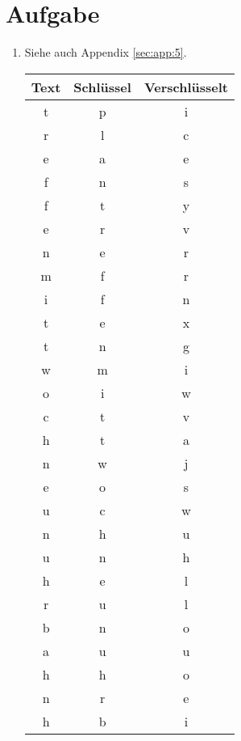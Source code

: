 \documentclass[DIN, pagenumber=false, fontsize=11pt, parskip=half]{scrartcl}
\begin{document}
    \section{Aufgabe}
    \begin{enumerate}[label=\alph*)]
        \item 
            Siehe auch Appendix \ref{sec:app:5}.
            \begin{table}[H]
                \centering
                \begin{tabular}{ccc}
                    \toprule
                    Text & Schlüssel & Verschlüsselt \\
                    \midrule
                    t & p & i \\
                    r & l & c \\
                    e & a & e \\
                    f & n & s \\
                    f & t & y \\
                    e & r & v \\
                    n & e & r \\
                    m & f & r \\
                    i & f & n \\
                    t & e & x \\
                    t & n & g \\
                    w & m & i \\
                    o & i & w \\
                    c & t & v \\
                    h & t & a \\
                    n & w & j \\
                    e & o & s \\
                    u & c & w \\
                    n & h & u \\
                    u & n & h \\
                    h & e & l \\
                    r & u & l \\
                    b & n & o \\
                    a & u & u \\
                    h & h & o \\
                    n & r & e \\
                    h & b & i \\

\end{tabular}
\end{table}
\end{enumerate}
\end{document}
